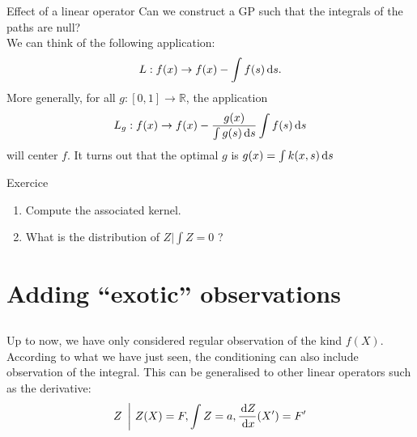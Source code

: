\begin{frame}{Effect of a linear operator}
Can we construct a GP such that the integrals of the paths are null?\\ \vspace{3mm}
We can think of the following application:
$$ L : f(x) \rightarrow f(x) - \int f(s) \, \mathrm{d} s.$$
More generally, for all $g: [0,1] \rightarrow \mathds{R}$, the application
$$ L_g : f(x) \rightarrow f(x) - \frac{g(x)}{\int g(s) \, \mathrm{d} s}\int f(s) \, \mathrm{d} s$$
will center $f$. It turns out that the optimal $g$ is $g(x) =\int k(x,s) \, \mathrm{d} s$
\begin{exampleblock}{Exercice}
\begin{enumerate}
	\item Compute the associated kernel.
	\item What is the distribution of $Z|\int Z = 0$ ?
\end{enumerate}
\end{exampleblock}
\end{frame}

\section[Exotic obs.]{Adding ``exotic'' observations}
\subsection{}

\begin{frame}{}
Up to now, we have only considered regular observation of the kind $f(X)$. \\ \vspace{5mm}
According to what we have just seen, the conditioning can also include observation of the integral. This can be generalised to other linear operators such as the derivative:
$$ Z \ \left| \ Z(X) = F, \int Z = a, \frac{\dx Z}{\dx x}(X')= F' \right. $$
\end{frame}

